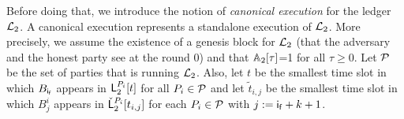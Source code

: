 

Before doing that, we introduce the notion of \emph{canonical execution} for the ledger $\mathcal{L}_2$. A canonical execution represents a standalone execution of $\mathcal{L}_2$. More precisely, 
we assume the existence of a genesis block for $\mathcal{L}_2$ (that the adversary and the honest party see at the round $0$) and that $\mathbb{A}_2[\tau]$=1 for all $\tau \geq 0$.
 Let $\mathcal{P}$ be the set of parties that is running $\mathcal{L}_2$. Also, 
let $t$ be the smallest time slot in which $B_{\mathsf{i_f}}$ appears in  $\mathsf{L}_2^{P_i}[t]$ for all $P_i\in\mathcal{P}$ 
and let $\tilde t_{i,j}$ be the smallest time slot in which $B^i_{j}$ appears in $\check {\mathsf{L}}_2^{P_i}[t_{i,j}]$ for each 
$P_i\in\mathcal{P}$ with $j:=\mathsf{i_f}+k+1$.


